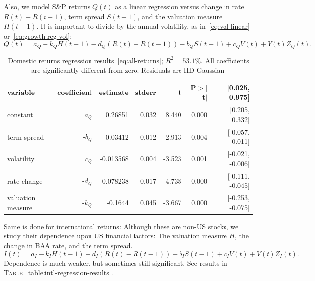\documentclass[12pt]{amsart}
\begin{document}
Also, we model S\&P returns $Q(t)$ as a linear regression versus change in rate $R(t) - R(t-1)$, term spread $S(t-1)$, and the valuation measure $H(t-1)$. It is important to divide by the annual volatility, as in~\eqref{eq:vol-linear} or~\eqref{eq:growth-reg-vol}:
\begin{equation}
\label{eq:all-returns}
Q(t) = a_Q - k_QH(t-1) - d_Q(R(t) - R(t-1)) - b_QS(t-1) + c_QV(t) + V(t)Z_Q(t).
\end{equation}

\begin{table}[h]
\centering
\begin{tabular}{lrrrrrr}
\hline
\textbf{variable} & \textbf{coefficient} & \textbf{estimate} & \textbf{stderr} & \textbf{t} & \textbf{P$>\vert$t$\vert$} & \textbf{[0.025, 0.975]} \\
\hline
constant & $a_Q$  & 0.26851  & 0.032 & 8.440  & 0.000 & [0.205, 0.332] \\
term spread & -$b_Q$ & -0.03412 & 0.012 & -2.913 & 0.004 & [-0.057, -0.011] \\
volatility & $c_Q$ & -0.013568 & 0.004 & -3.523 & 0.001 & [-0.021, -0.006] \\
rate change & -$d_Q$ & -0.078238 & 0.017 & -4.738 & 0.000 & [-0.111, -0.045] \\
valuation measure & -$k_Q$ & -0.1644 & 0.045 & -3.667 & 0.000 & [-0.253, -0.075] \\
\hline
\end{tabular}
\caption{Domestic returns regression results~\eqref{eq:all-returns}; $R^2 = 53.1\%$. All coefficients are significantly different from zero. Residuals are IID Gaussian.}
\label{tab:regression_results_model3}
\end{table}

Same is done for international returns: Although these are non-US stocks, we study their dependence upon US financial factors: The valuation measure $H$, the change in BAA rate, and the term spread. 
\begin{equation}
\label{eq:intl-returns}
I(t) = a_I - k_IH(t-1) - d_I(R(t) - R(t-1)) - b_IS(t-1) + c_IV(t) + V(t)Z_I(t).
\end{equation}
Dependence is much weaker, but sometimes still significant. See results in \textsc{Table}~\ref{table:intl-regression-results}.
\end{document}

